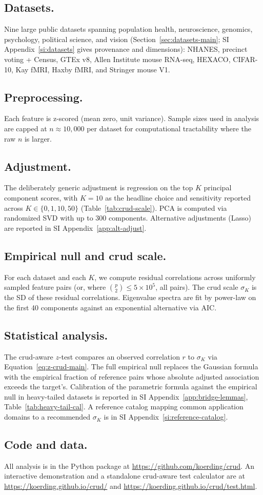 \subsection*{Datasets.} Nine large public datasets spanning population health, neuroscience, genomics, psychology, political science, and vision (Section~\ref{sec:datasets-main}; SI Appendix~\ref{si:datasets} gives provenance and dimensions): NHANES, precinct voting + Census, GTEx v8, Allen Institute mouse RNA-seq, HEXACO, CIFAR-10, Kay fMRI, Haxby fMRI, and Stringer mouse V1.

\subsection*{Preprocessing.} Each feature is z-scored (mean zero, unit variance). Sample sizes used in analysis are capped at $n\approx 10{,}000$ per dataset for computational tractability where the raw $n$ is larger.

\subsection*{Adjustment.} The deliberately generic adjustment is regression on the top $K$ principal component scores, with $K=10$ as the headline choice and sensitivity reported across $K\in\{0,1,10,50\}$ (Table~\ref{tab:crud-scale}). PCA is computed via randomized SVD with up to $300$ components. Alternative adjustments (Lasso) are reported in SI Appendix~\ref{app:alt-adjust}.

\subsection*{Empirical null and crud scale.} For each dataset and each $K$, we compute residual correlations across uniformly sampled feature pairs (or, where $\binom{p}{2}\le 5\times 10^5$, all pairs). The crud scale $\sigma_K$ is the SD of these residual correlations. Eigenvalue spectra are fit by power-law on the first 40 components against an exponential alternative via AIC.

\subsection*{Statistical analysis.} The crud-aware $z$-test compares an observed correlation $r$ to $\sigma_K$ via Equation~\eqref{eq:z-crud-main}. The full empirical null replaces the Gaussian formula with the empirical fraction of reference pairs whose absolute adjusted association exceeds the target's. Calibration of the parametric formula against the empirical null in heavy-tailed datasets is reported in SI Appendix~\ref{app:bridge-lemmas}, Table~\ref{tab:heavy-tail-cal}. A reference catalog mapping common application domains to a recommended $\sigma_K$ is in SI Appendix~\ref{si:reference-catalog}.

\subsection*{Code and data.} All analysis is in the Python package at \url{https://github.com/koerding/crud}. An interactive demonstration and a standalone crud-aware test calculator are at \url{https://koerding.github.io/crud/} and \url{https://koerding.github.io/crud/test.html}.
